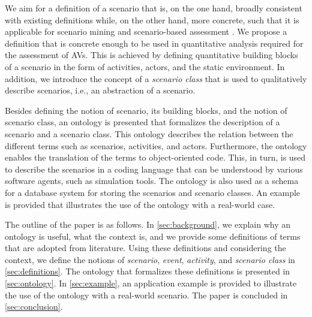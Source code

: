 We aim for a definition of a scenario that is, on the one hand, broadly consistent with existing definitions \cite{geyer2014, ulbrich2015, elrofai2016scenario} while, on the other hand, more concrete, such that it is applicable for scenario mining \cite{elrofai2016scenario} and scenario-based assessment \cite{stellet2015taxonomy, deGelder2017assessment}. We propose a definition that is concrete enough to be used in quantitative analysis required for the assessment of AVs. This is achieved by defining quantitative building blocks of a scenario in the form of activities, actors, and the static environment. In addition, we introduce the concept of a \emph{scenario class} that is used to qualitatively describe scenarios, i.e., an abstraction of a scenario. 

\cbstartb
Besides defining the notion of scenario, its building blocks, and the notion of scenario class, an ontology is presented that formalizes the description of a scenario and a scenario class. 
This ontology describes the relation between the different terms such as scenarios, activities, and actors.
Furthermore, the ontology enables the translation of the terms to object-oriented code.
This, in turn, is used to describe the scenarios in a coding language that can be understood by various software agents, such as simulation tools.
The ontology is also used as a schema for a database system for storing the scenarios and scenario classes.
An example is provided that illustrates the use of the ontology with a real-world case.
\cbend

The outline of the paper is as follows. In \cref{sec:background}, we explain why an ontology is useful, what the context is, and we provide some definitions of terms that are adopted from literature. 
Using these definitions and considering the context, we define the notions of \emph{scenario}, \emph{event}, \emph{activity}, and \emph{scenario class} in \cref{sec:definitions}. 
The ontology that formalizes these definitions is presented in \cref{sec:ontology}. 
In \cref{sec:example}, an application example is provided to illustrate the use of the ontology with a real-world scenario. 
The paper is concluded in \cref{sec:conclusion}.
